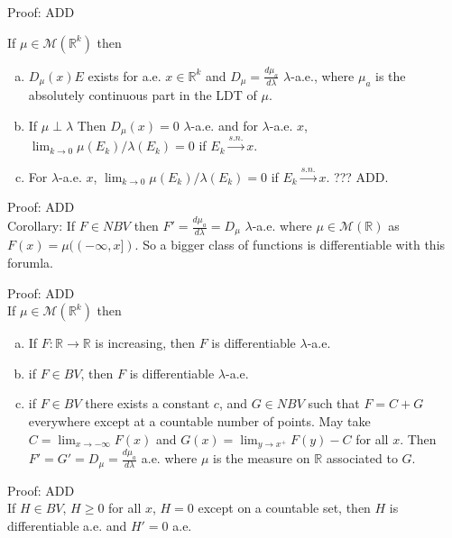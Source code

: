 \documentclass[12pt]{article}
\newcommand{\rarw}[0] { \rightarrow }
\newcommand{\reals}[0] { \mathbb{R}}
\newcommand{\M}[0] { \mathcal{M} }
\begin{document}
\vspace{0.5in}

\noindent
Proof: ADD \\


\break




If $\mu \in \M(\reals^k)$ then
\begin{enumerate}[a)]
\item
$D_\mu(x)E$ exists for a.e. $x \in \reals^k$ and $D_\mu = \frac{d\mu_a}{d\lambda}$ $\lambda$-a.e., where $\mu_a$ is the absolutely continuous part in the LDT of $\mu$.
\item
If $\mu \perp \lambda$ Then $D_\mu(x) = 0$ $\lambda$-a.e. and for $\lambda$-a.e. $x$, $\lim_{k \rarw 0} \mu(E_k) / \lambda(E_k) = 0$ if $E_k \overset{s.n.}{\rarw} x$.
\item
For $\lambda$-a.e. $x$, $\lim_{k \rarw 0} \mu(E_k) / \lambda(E_k) = 0$ if $E_k \overset{s.n.}{\rarw} x$. ??? ADD.
\end{enumerate}



\noindent
Proof: ADD \\

Corollary: If $F \in NBV$ then $F' = \frac{d\mu_a}{d\lambda} = D_\mu$ $\lambda$-a.e. where $\mu \in \M(\reals)$ as $F(x) = \mu((-\infty,x])$. So a bigger class of functions is differentiable with this forumla.

\noindent
Proof: ADD \\



If $\mu \in \M(\reals^k)$ then
\begin{enumerate}[a)]
\item
If $F: \reals \rarw \reals$ is increasing, then $F$ is differentiable $\lambda$-a.e.
\item
if $F \in BV$, then $F$ is differentiable $\lambda$-a.e.
\item
if $F \in BV$  there exists a constant $c$, and $G \in NBV$ such that $F = C + G$ everywhere except at a countable number of points. May take $C = \lim_{x \rarw - \infty}  F(x)$ and $G(x) = \lim_{ y \rarw x^+} F(y) - C$ for all $x$. Then $F' = G' = D_\mu = \frac{d\mu_a}{d\lambda}$ a.e. where $\mu$ is the measure on $\reals$ associated to $G$.
\end{enumerate}


\noindent
Proof: ADD \\


If $H \in BV$, $H \ge 0$ for all $x$, $H = 0$ except on a countable set, then $H$ is differentiable a.e. and $H' = 0$ a.e.
\end{document}
